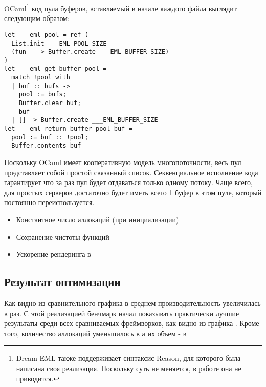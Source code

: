 OCaml\footnote{Dream EML также поддерживает синтаксис Reason, для которого была написана своя реализация. Поскольку суть не меняется, в работе она не приводится.} код пула буферов, вставляемый в начале каждого файла  выглядит следующим образом:

\begin{lstlisting}
let ___eml_pool = ref (
  List.init ___EML_POOL_SIZE 
  (fun _ -> Buffer.create ___EML_BUFFER_SIZE)
)
let ___eml_get_buffer pool =
  match !pool with
  | buf :: bufs ->
    pool := bufs;
    Buffer.clear buf;
    buf
  | [] -> Buffer.create ___EML_BUFFER_SIZE
let ___eml_return_buffer pool buf =
  pool := buf :: !pool;
  Buffer.contents buf
\end{lstlisting}


Поскольку OCaml имеет кооперативную модель многопоточности, весь пул представляет собой простой связанный список.
Секвенциальное исполнение кода гарантирует что за раз пул будет отдаваться только одному потоку. 
Чаще всего, для простых серверов достаточно будет иметь всего 1 буфер в этом пуле, который постоянно переиспользуется.





\begin{itemize}
  \item Константное число аллокаций (при инициализации)
  \item Сохранение чистоты функций
  \item Ускорение рендеринга в 
\end{itemize}

\subsection{Результат оптимизации}


Как видно из сравнительного графика %
в среднем производительность увеличилась в %
раз.
С этой реализацией бенчмарк начал показывать практически лучшие результаты среди всех сравниваемых фреймворков, как видно из графика . %
Кроме того, количество аллокаций уменьшилось в %
а их объем - в %


